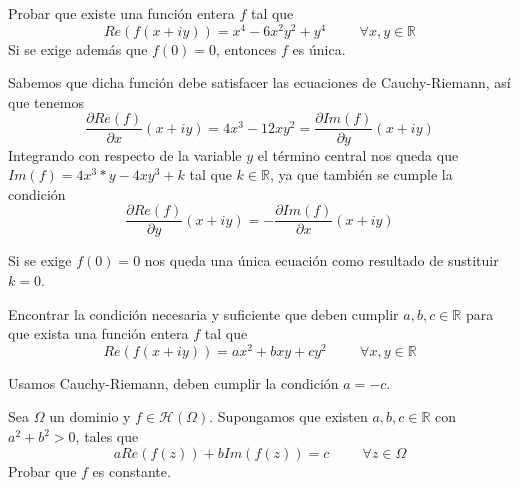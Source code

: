 \begin{ejer}
	Probar que existe una función entera $f$ tal que
	$$Re(f(x+iy)) = x^4-6x^2y^2+y^4 \hspace{1cm}\forall x,y\in\mathbb{R}$$
	Si se exige además que $f(0)=0$, entonces $f$ es única.
\end{ejer}
\begin{sol}
Sabemos que dicha función debe satisfacer las ecuaciones de Cauchy-Riemann, así que tenemos
$$ \frac{\partial Re(f)}{\partial x}(x+iy) = 4x^3-12xy^2 = \frac{\partial Im(f)}{\partial y}(x+iy) $$
Integrando con respecto de la variable $y$ el término central nos queda que
$Im(f) = 4x^3*y - 4xy^3+k$ tal que $k\in\mathbb{R}$, ya que también se cumple la condición 
$$ \frac{\partial Re(f)}{\partial y} (x+iy) = -\frac{\partial Im(f)}{\partial x} (x+iy) $$

Si se exige $f(0)=0$ nos queda una única ecuación como resultado de sustituir $k=0$.
\end{sol}

\begin{ejer}
	Encontrar la condición necesaria y suficiente que deben cumplir $a,b,c\in\mathbb{R}$ para que exista una función entera $f$ tal que
	$$ Re(f(x+iy)) = ax^2+bxy+cy^2\hspace{1cm}\forall x,y\in\mathbb{R} $$
\end{ejer}
Usamos Cauchy-Riemann, deben cumplir la condición $a=-c$.


\begin{ejer}
	Sea $\Omega$ un dominio y $f\in\mathcal{H}(\Omega)$. Supongamos que existen $a,b,c\in\mathbb{R}$ con $a^2+b^2>0$, tales que
	$$ aRe(f(z)) + bIm(f(z)) = c\hspace{1cm} \forall z\in\Omega $$
	Probar que $f$ es constante.
\end{ejer}

